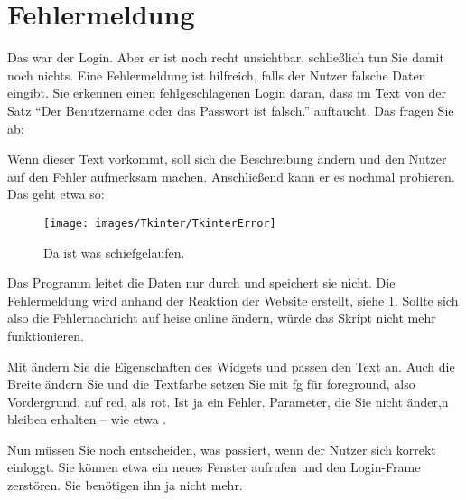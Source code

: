 
\section{Fehlermeldung}

Das war der Login. Aber er ist noch recht unsichtbar, schließlich tun Sie damit noch nichts. Eine Fehlermeldung ist hilfreich, falls der Nutzer falsche Daten eingibt. Sie erkennen einen fehlgeschlagenen Login daran, dass im Text von  der Satz ``Der Benutzername oder das Passwort ist falsch.'' auftaucht. Das fragen Sie ab:

\medskip


\medskip

Wenn dieser Text vorkommt, soll sich die Beschreibung ändern und den Nutzer auf den Fehler aufmerksam machen. Anschließend kann er es nochmal probieren. Das geht etwa so:

\medskip


\medskip

\begin{figure}
    \texttt{[image: images/Tkinter/TkinterError]}
    \caption{Da ist was schiefgelaufen.} \label{TkinterError}
\end{figure}




Das Programm leitet die Daten nur durch und speichert sie nicht. Die Fehlermeldung wird anhand der Reaktion der Website erstellt, siehe \ref{TkinterError}. Sollte sich also die Fehlernachricht auf heise online ändern, würde das Skript nicht mehr funktionieren.

Mit  ändern Sie die Eigenschaften des Widgets und passen den Text an. Auch die Breite ändern Sie und die Textfarbe setzen Sie mit fg für foreground, also Vordergrund, auf red, als rot. Ist ja ein Fehler. Parameter, die Sie nicht änder,n bleiben erhalten -- wie etwa .

Nun müssen Sie noch entscheiden, was passiert, wenn der Nutzer sich korrekt einloggt. Sie können etwa ein neues Fenster aufrufen und den Login-Frame zerstören. Sie benötigen ihn ja nicht mehr.

